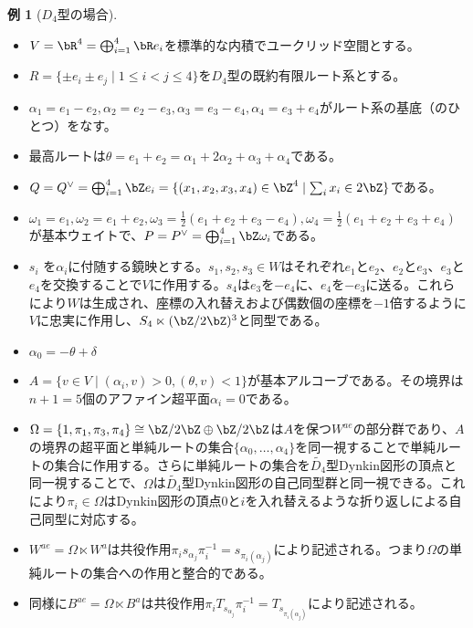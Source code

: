 \documentclass[uplatex, a4paper, dvipdfmx]{jsarticle}
\theoremstyle{definition}
\newtheorem{example}[theorem]{例}
\begin{document}
\begin{example}[$D_4$型の場合]
    \begin{itemize}
        \item  $V = \bR^4 = \bigoplus_{i=1}^4 \bR e_i$を標準的な内積でユークリッド空間とする。
        \item  $R = \{\pm e_i \pm e_j \mid 1 \leq i < j \leq 4\}$を$D_4$型の既約有限ルート系とする。
        \item $\alpha_1 = e_1 - e_2, \alpha_2 = e_2 - e_3, \alpha_3 = e_3 - e_4, \alpha_4 = e_3 + e_4$がルート系の基底（のひとつ）をなす。
        \item 最高ルートは$\theta = e_1 + e_2 = \alpha_1 + 2\alpha_2 + \alpha_3 + \alpha_4$である。
        \item $Q = Q^\vee = \bigoplus_{i=1}^4 \bZ e_i = \{(x_1, x_2, x_3, x_4) \in \bZ^4\mid \sum_i x_i \in 2 \bZ\}$である。
        \item $\omega_1 = e_1, \omega_2 = e_1 + e_2, \omega_3 = \frac{1}{2}(e_1 + e_2 + e_3 - e_4), \omega_4 = \frac{1}{2}(e_1 + e_2 + e_3 + e_4)$が基本ウェイトで、$P = P^\vee = \bigoplus_{i=1}^4 \bZ \omega_i$である。
        \item $s_i$ を$\alpha_i$に付随する鏡映とする。$s_1, s_2, s_3 \in W$はそれぞれ$e_1$と$e_2$、$e_2$と$e_3$、$e_3$と$e_4$を交換することで$V$に作用する。$s_4$は$e_3$を$-e_4$に、$e_4$を$-e_3$に送る。これらにより$W$は生成され、座標の入れ替えおよび偶数個の座標を$-1$倍するように$V$に忠実に作用し、$S_4 \ltimes (\bZ/2\bZ)^3$と同型である。
        \item $\alpha_0 = -\theta + \delta$
        \item $A = \{v \in V \mid (\alpha_i, v)>0, (\theta, v)<1\}$が基本アルコーブである。その境界は$n+1 = 5$個のアファイン超平面$\alpha_i = 0$である。
        \item $\Omega = \{1, \pi_1, \pi_3, \pi_4\} \cong \bZ/2\bZ \oplus \bZ/2\bZ$は$A$を保つ$W^{ae}$の部分群であり、$A$の境界の超平面と単純ルートの集合$\{\alpha_0, \dots, \alpha_4\}$を同一視することで単純ルートの集合に作用する。さらに単純ルートの集合を$\widetilde{D_4}$型Dynkin図形の頂点と同一視することで、$\Omega$は$\widetilde{D_4}$型Dynkin図形の自己同型群と同一視できる。これにより$\pi_i \in \Omega$はDynkin図形の頂点$0$と$i$を入れ替えるような折り返しによる自己同型に対応する。
        \item $W^{ae} = \Omega \ltimes W^a$は共役作用$\pi_i s_{\alpha_j} \pi_i^{-1} = s_{\pi_i(\alpha_j)}$により記述される。つまり$\Omega$の単純ルートの集合への作用と整合的である。
        \item 同様に$B^{ae} = \Omega \ltimes B^a$は共役作用$\pi_i T_{s_{\alpha_j}} \pi_i^{-1} = T_{s_{\pi_i(\alpha_j)}}$により記述される。
    \end{itemize}
\end{example}
\end{document}
